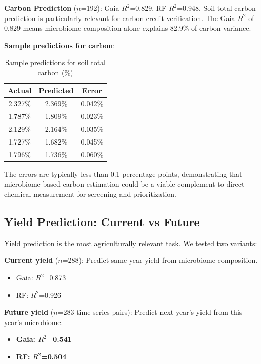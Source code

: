 \documentclass[11pt,a4paper]{article}
\begin{document}
\textbf{Carbon Prediction} ($n$=192): Gaia $R^2$=0.829, RF $R^2$=0.948. Soil total carbon prediction is particularly relevant for carbon credit verification. The Gaia $R^2$ of 0.829 means microbiome composition alone explains 82.9\% of carbon variance.

\textbf{Sample predictions for carbon}:

\begin{table}[H]
\centering
\caption{Sample predictions for soil total carbon (\%)}
\begin{tabular}{ccc}
\toprule
\textbf{Actual} & \textbf{Predicted} & \textbf{Error} \\
\midrule
2.327\% & 2.369\% & 0.042\% \\
1.787\% & 1.809\% & 0.023\% \\
2.129\% & 2.164\% & 0.035\% \\
1.727\% & 1.682\% & 0.045\% \\
1.796\% & 1.736\% & 0.060\% \\
\bottomrule
\end{tabular}
\end{table}

The errors are typically less than 0.1 percentage points, demonstrating that microbiome-based carbon estimation could be a viable complement to direct chemical measurement for screening and prioritization.

\subsection{Yield Prediction: Current vs Future}

Yield prediction is the most agriculturally relevant task. We tested two variants:

\textbf{Current yield} ($n$=288): Predict same-year yield from microbiome composition.
\begin{itemize}[leftmargin=1.5em]
    \item Gaia: $R^2$=0.873
    \item RF: $R^2$=0.926
\end{itemize}

\textbf{Future yield} ($n$=283 time-series pairs): Predict next year's yield from this year's microbiome.
\begin{itemize}[leftmargin=1.5em]
    \item \textbf{Gaia: $R^2$=0.541}
    \item \textbf{RF: $R^2$=0.504}
\end{itemize}
\end{document}
